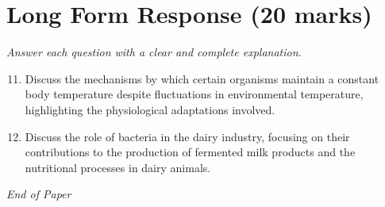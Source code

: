 \documentclass[12pt]{article}
\begin{document}
\section*{Long Form Response (20 marks)}
\textit{Answer each question with a clear and complete explanation.}
\begin{enumerate}[label=\arabic*.]
\setcounter{enumi}{10}
\item Discuss the mechanisms by which certain organisms maintain a constant body temperature despite fluctuations in environmental temperature, highlighting the physiological adaptations involved.
\item Discuss the role of bacteria in the dairy industry, focusing on their contributions to the production of fermented milk products and the nutritional processes in dairy animals.
\end{enumerate}

\vfill
\noindent\textit{End of Paper}
\end{document}
